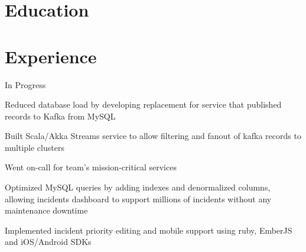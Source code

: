 \documentclass[12pt]{jmichaud-resume}
\begin{document}
\begin{minipage}[t]{0.29\textwidth}
\vspace{20pt}

\section{Education} 




\end{minipage}
\hfill
\begin{minipage}[t]{0.64\textwidth}
\section{Experience}
 \hfill {}

\vspace{10pt}

\begin{tightemize}
	\item In Progress
	
\end{tightemize}
\sectionsep
{} \hfill {}


\begin{tightemize}
	\item Reduced database load by developing replacement for service that published records to Kafka from MySQL
	\item Built Scala/Akka Streams service to allow filtering and fanout of kafka records to multiple clusters
	\item Went on-call for team's mission-critical services
	
\end{tightemize}
\sectionsep
{}\hfill {}

\vspace{3pt}

\begin{tightemize}
	\item Optimized MySQL queries by adding indexes and denormalized columns, allowing incidents dashboard to support millions of incidents without any maintenance downtime
	\item Implemented incident priority editing and mobile support using ruby, EmberJS and iOS/Android SDKs
\end{tightemize}
\sectionsep


\end{minipage}
\end{document}
